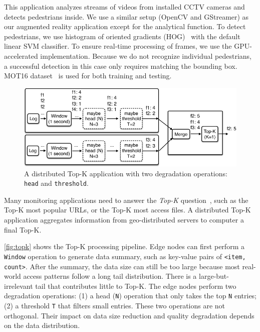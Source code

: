  This application analyzes streams of videos from
installed CCTV cameras and detects pedestrians inside. We use a similar setup
(OpenCV and GStreamer) as our augmented reality application except for the
analytical function. To detect pedestrians, we use histogram of oriented
gradients (HOG)~\cite{dalal2005histograms} with the default linear SVM
classifier. To ensure real-time processing of frames, we use the GPU-accelerated
implementation. Because we do not recognize individual pedestrians, a successful
detection in this case only requires matching the bounding box.  MOT16
dataset~\cite{milan2016mot16} is used for both training and testing.

\begin{figure}
  \centering
  \includegraphics[width=\columnwidth]{figures/topk.pdf}
  \caption{A distributed Top-K application with two degradation operations:
    \texttt{head} and \texttt{threshold}.}
  \label{fig:topk}
\end{figure}


 Many monitoring applications need to answer the
\textit{Top-K} question~\cite{babcock2003distributed}, such as the Top-K most
popular URLs, or the Top-K most access files. A distributed Top-K application
aggregates information from geo-distributed servers to computer a final Top-K.

\autoref{fig:topk} shows the Top-K processing pipeline. Edge nodes can first
perform a \texttt{Window} operation to generate data summary, such as key-value
pairs of \texttt{<item, count>}. After the summary, the data size can still be
too large because most real-world access patterns follow a long tail
distribution. There is a large-but-irrelevant tail that contributes little to
Top-K. The edge nodes perform two degradation operations: (1) a head
(\texttt{N}) operation that only takes the top \texttt{N} entries; (2) a
threshold \texttt{T} that filters small entries. These two operations are not
orthogonal. Their impact on data size reduction and quality degradation depends
on the data distribution.

